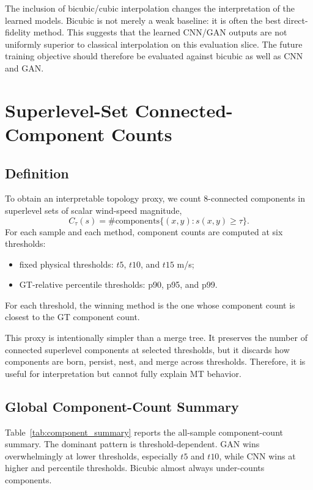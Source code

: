\documentclass[conference]{IEEEtran}
\begin{document}
The inclusion of bicubic/cubic interpolation changes the interpretation of the learned models. Bicubic is not merely a weak baseline: it is often the best direct-fidelity method. This suggests that the learned CNN/GAN outputs are not uniformly superior to classical interpolation on this evaluation slice. The future training objective should therefore be evaluated against bicubic as well as CNN and GAN.

\section{Superlevel-Set Connected-Component Counts}

\subsection{Definition}

To obtain an interpretable topology proxy, we count 8-connected components in superlevel sets of scalar wind-speed magnitude,
\begin{equation}
    C_{\tau}(s) = \# \mathrm{components}\{(x,y): s(x,y) \geq \tau\}.
\end{equation}
For each sample and each method, component counts are computed at six thresholds:
\begin{itemize}
    \item fixed physical thresholds: $t5$, $t10$, and $t15$ m/s;
    \item GT-relative percentile thresholds: p90, p95, and p99.
\end{itemize}
For each threshold, the winning method is the one whose component count is closest to the GT component count.

This proxy is intentionally simpler than a merge tree. It preserves the number of connected superlevel components at selected thresholds, but it discards how components are born, persist, nest, and merge across thresholds. Therefore, it is useful for interpretation but cannot fully explain MT behavior.

\subsection{Global Component-Count Summary}

Table~\ref{tab:component_summary} reports the all-sample component-count summary. The dominant pattern is threshold-dependent. GAN wins overwhelmingly at lower thresholds, especially $t5$ and $t10$, while CNN wins at higher and percentile thresholds. Bicubic almost always under-counts components.
\end{document}
